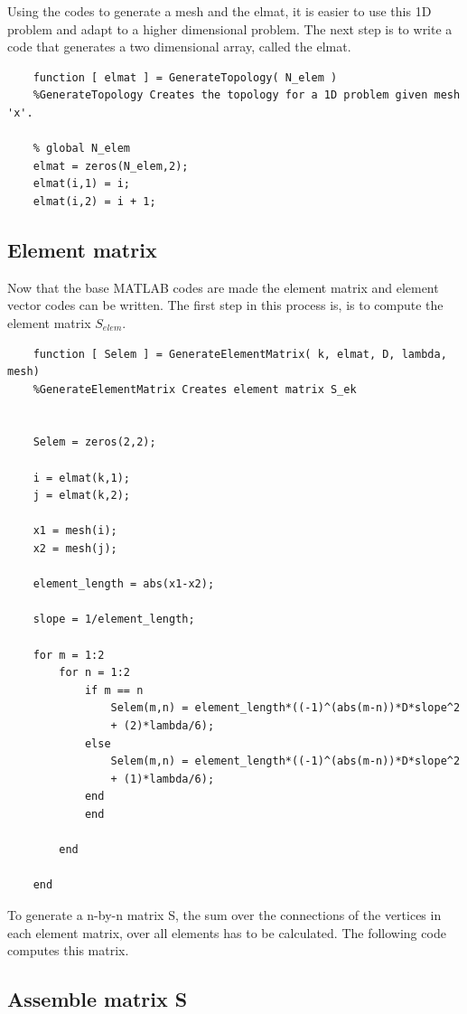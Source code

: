 \documentclass[a4paper]{report}
\begin{document}
Using the codes to generate a mesh and the elmat, it is easier to use this 1D problem and adapt to a higher dimensional problem. The next step is to write a code that generates a two dimensional array, called the elmat.

\begin{lstlisting}
	function [ elmat ] = GenerateTopology( N_elem )
	%GenerateTopology Creates the topology for a 1D problem given mesh 'x'.
	
	% global N_elem
	elmat = zeros(N_elem,2);
	elmat(i,1) = i;
	elmat(i,2) = i + 1;

\end{lstlisting}

\subsection{Element matrix}

Now that the base MATLAB codes are made the element matrix and element vector codes can be written. The first step in this process is, is to compute the element matrix $S_{elem}$.

\begin{lstlisting}
	function [ Selem ] = GenerateElementMatrix( k, elmat, D, lambda, mesh)
	%GenerateElementMatrix Creates element matrix S_ek
	
	
	Selem = zeros(2,2);
	
	i = elmat(k,1);
	j = elmat(k,2);
	
	x1 = mesh(i);
	x2 = mesh(j);
	
	element_length = abs(x1-x2);
	
	slope = 1/element_length; 
	
	for m = 1:2
		for n = 1:2
			if m == n
				Selem(m,n) = element_length*((-1)^(abs(m-n))*D*slope^2
				+ (2)*lambda/6);
			else
				Selem(m,n) = element_length*((-1)^(abs(m-n))*D*slope^2
				+ (1)*lambda/6);
			end
			end
	
		end
	
	end
\end{lstlisting}

\bigskip

To generate a n-by-n matrix S, the sum over the connections of the vertices in each element matrix, over all elements has to be calculated. The following code computes this matrix.


\subsection{Assemble matrix S}
\end{document}
